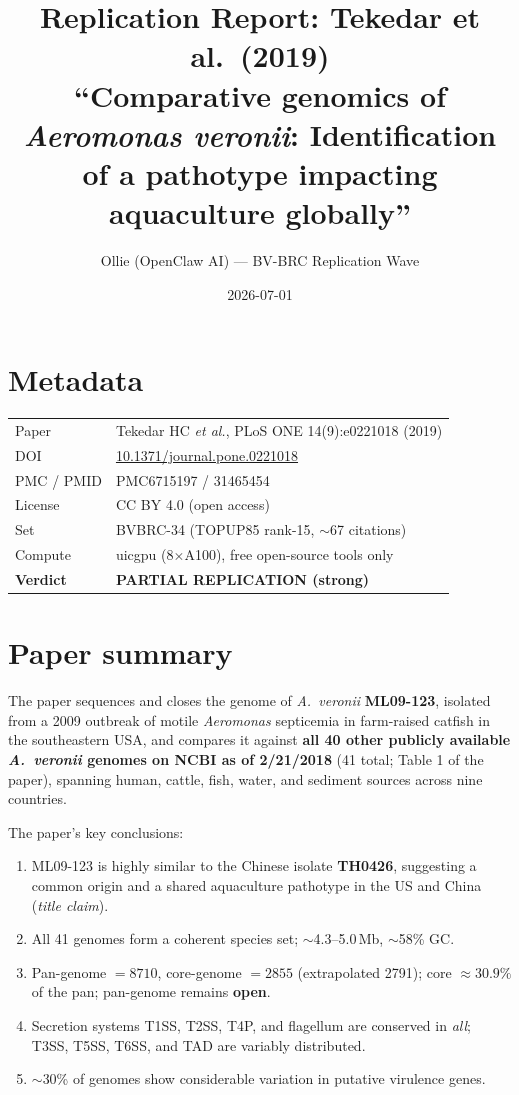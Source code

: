 \documentclass[11pt]{article}
\title{Replication Report: Tekedar et al.\ (2019)\\
\large ``Comparative genomics of \emph{Aeromonas veronii}: Identification of a pathotype impacting aquaculture globally''}
\author{Ollie (OpenClaw AI) --- BV-BRC Replication Wave}
\date{2026-07-01}
\begin{document}
\maketitle

\section*{Metadata}
\begin{tabular}{ll}
\toprule
Paper & Tekedar HC \emph{et al.}, PLoS ONE 14(9):e0221018 (2019) \\
DOI & \href{https://doi.org/10.1371/journal.pone.0221018}{10.1371/journal.pone.0221018} \\
PMC / PMID & PMC6715197 / 31465454 \\
License & CC BY 4.0 (open access) \\
Set & BVBRC-34 (TOPUP85 rank-15, $\sim$67 citations) \\
Compute & uicgpu (8$\times$A100), free open-source tools only \\
\textbf{Verdict} & \textbf{PARTIAL REPLICATION (strong)} \\
\bottomrule
\end{tabular}

\section{Paper summary}
The paper sequences and closes the genome of \emph{A.\ veronii} \textbf{ML09-123}, isolated
from a 2009 outbreak of motile \emph{Aeromonas} septicemia in farm-raised catfish
in the southeastern USA, and compares it against \textbf{all 40 other publicly
available \emph{A.\ veronii} genomes on NCBI as of 2/21/2018} (41 total; Table 1 of the paper),
spanning human, cattle, fish, water, and sediment sources across nine countries.

The paper's key conclusions:
\begin{enumerate}
  \item ML09-123 is highly similar to the Chinese isolate \textbf{TH0426}, suggesting a
        common origin and a shared aquaculture pathotype in the US and China
        (\emph{title claim}).
  \item All 41 genomes form a coherent species set; $\sim$4.3--5.0\,Mb, $\sim$58\% GC.
  \item Pan-genome $= 8710$, core-genome $= 2855$ (extrapolated 2791); core $\approx 30.9\%$
        of the pan; pan-genome remains \textbf{open}.
  \item Secretion systems T1SS, T2SS, T4P, and flagellum are conserved in \emph{all};
        T3SS, T5SS, T6SS, and TAD are variably distributed.
  \item $\sim$30\% of genomes show considerable variation in putative virulence genes.
\end{enumerate}
\end{document}
